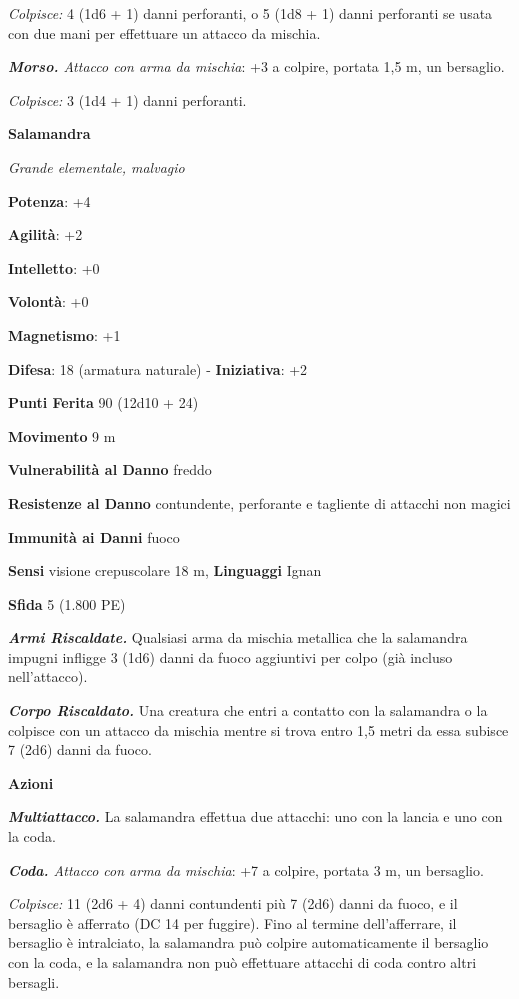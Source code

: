 \begin{multicols}{2}
\emph{Colpisce:} 4 (1d6 + 1) danni perforanti, o 5 (1d8 + 1) danni
perforanti se usata con due mani per effettuare un attacco da mischia.

\emph{\textbf{Morso.} Attacco con arma da mischia}: +3 a colpire,
portata 1,5 m, un bersaglio.

\emph{Colpisce:} 3 (1d4 + 1) danni perforanti.

\textbf{Salamandra}

\emph{Grande elementale, malvagio}

\textbf{Potenza}: +4

\textbf{Agilità}: +2

\textbf{Intelletto}: +0

\textbf{Volontà}: +0

\textbf{Magnetismo}: +1

\textbf{Difesa}: 18 (armatura naturale) - \textbf{Iniziativa}: +2

\textbf{Punti Ferita} 90 (12d10 + 24)

\textbf{Movimento} 9 m

\textbf{Vulnerabilità al Danno} freddo

\textbf{Resistenze al Danno} contundente, perforante e tagliente di
attacchi non magici

\textbf{Immunità ai Danni} fuoco

\textbf{Sensi} visione crepuscolare 18 m, 
\textbf{Linguaggi} Ignan

\textbf{Sfida} 5 (1.800 PE)

\emph{\textbf{Armi Riscaldate.}} Qualsiasi arma da mischia metallica che
la salamandra impugni infligge 3 (1d6) danni da fuoco aggiuntivi per
colpo (già incluso nell'attacco).

\emph{\textbf{Corpo Riscaldato.}} Una creatura che entri a contatto con
la salamandra o la colpisce con un attacco da mischia mentre si trova
entro 1,5 metri da essa subisce 7 (2d6) danni da fuoco.

\textbf{Azioni}

\emph{\textbf{Multiattacco.}} La salamandra effettua due attacchi: uno
con la lancia e uno con la coda.

\emph{\textbf{Coda.} Attacco con arma da mischia}: +7 a colpire, portata
3 m, un bersaglio.

\emph{Colpisce:} 11 (2d6 + 4) danni contundenti più 7 (2d6) danni da
fuoco, e il bersaglio è afferrato (DC 14 per fuggire). Fino al termine
dell'afferrare, il bersaglio è intralciato, la salamandra può colpire
automaticamente il bersaglio con la coda, e la salamandra non può
effettuare attacchi di coda contro altri bersagli.


\end{multicols}
